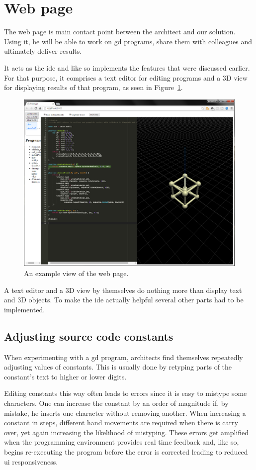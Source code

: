 \section{Web page}
The web page is main contact point between the architect and our solution.
Using it, he will be able to work on \gls{gd} programs, share them with colleagues and ultimately deliver results.

It acts as the \gls{ide} and like so implements the features that were discussed earlier.
For that purpose, it comprises a text editor for editing programs and a 3D view for displaying results of that program, as seen in Figure~\ref{fig:page:view}.

\begin{figure}
  \centering
  \includegraphics[width=12cm]{./images/webpage_view}
  \caption{An example view of the web page.}
  \label{fig:page:view}
\end{figure}

A text editor and a 3D view by themselves do nothing more than display text and 3D objects.
To make the \gls{ide} actually helpful several other parts had to be implemented.

\subsection{Adjusting source code constants}
When experimenting with a \gls{gd} program, architects find themselves repeatedly adjusting values of constants.
This is usually done by retyping parts of the constant's text to higher or lower digits.

Editing constants this way often leads to errors since it is easy to mistype some characters.
One can increase the constant by an order of magnitude if, by mistake, he inserts one character without removing another.
When increasing a constant in steps, different hand movements are required when there is carry over, yet again increasing the likelihood of mistyping.
These errors get amplified when the programming environment provides real time feedback and, like so, begins re-executing the program before the error is corrected leading to reduced \gls{ui} responsiveness.

